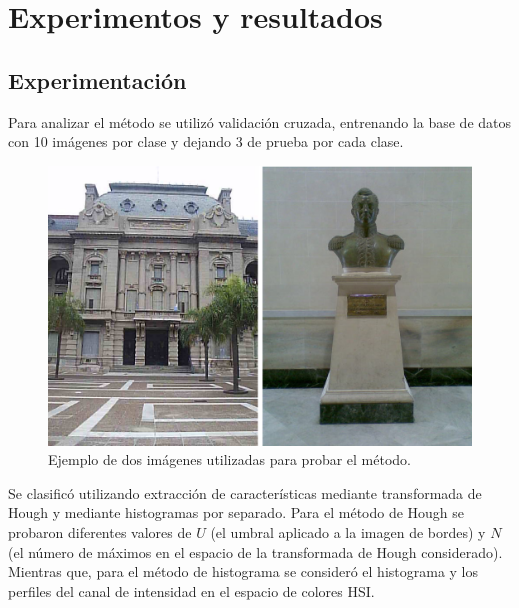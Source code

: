 \documentclass[conference,spanish,a4paper,10pt,oneside,final]{tfmpd}
\begin{document}
\section{Experimentos y resultados}
%
%
\subsection{Experimentación}
Para analizar %
el método se utilizó validación cruzada, entrenando la base de
datos con 10 imágenes por clase y dejando 3 de prueba por cada clase.

\begin{figure}
\begin{center}
\includegraphics[scale=0.25]{../diagramas/dibujo} 
\end{center}
\caption{Ejemplo de dos imágenes utilizadas para probar el método.}
\label{imagenes}
\end{figure}

Se 
clasificó utilizando extracción de características mediante
transformada de Hough y mediante histogramas por separado. Para el método de Hough
se probaron diferentes valores de $U$ (el umbral
aplicado a la imagen de bordes) y $N$ (el número de máximos en el espacio de
la transformada de Hough considerado). Mientras que, 
para el método de histograma se consideró el histograma y los perfiles del canal de
intensidad en el espacio de colores HSI.
\end{document}
